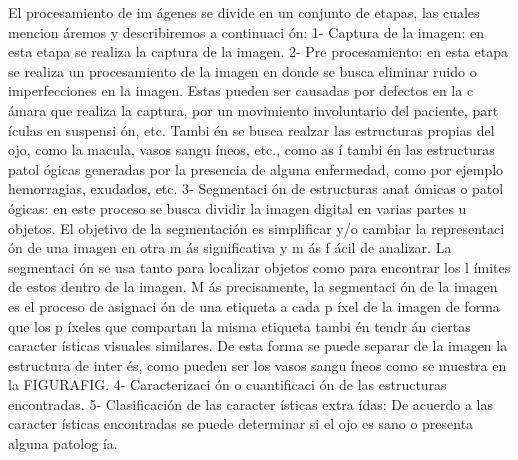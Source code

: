 El procesamiento de im \'agenes se divide en un conjunto de etapas, las cuales mencion \'aremos y describiremos a continuaci \'on:
1-	Captura de la imagen: en esta etapa se realiza la captura de la imagen.
2-	Pre procesamiento: en esta etapa se realiza un procesamiento de la imagen en donde se busca eliminar ruido o imperfecciones en la imagen. Estas pueden ser causadas por defectos en la c \'amara que realiza la captura, por un movimiento involuntario del paciente, part \'iculas en suspensi \'on, etc. Tambi \'en se busca realzar las estructuras propias del ojo, como la macula, vasos sangu \'ineos, etc.,  como as \'i tambi \'en las estructuras patol \'ogicas generadas por la presencia de alguna enfermedad, como por ejemplo hemorragias, exudados, etc. 
3-	Segmentaci \'on de estructuras anat \'omicas o patol \'ogicas: en este proceso se busca dividir la imagen digital en varias partes u objetos. El objetivo de la segmentación es simplificar y/o cambiar la representaci \'on de una imagen en otra m \'as significativa y m \'as f \'acil de analizar. La segmentaci \'on se usa tanto para localizar objetos como para encontrar los l \'imites de estos dentro de la imagen. M \'as precisamente, la segmentaci \'on de la imagen es el proceso de asignaci \'on de una etiqueta a cada p \'ixel de la imagen de forma que los p \'ixeles que compartan la misma etiqueta tambi \'en tendr \'an ciertas caracter \'isticas visuales similares. De esta forma se puede separar de la imagen la estructura de inter \'es, como pueden ser los vasos sangu \'ineos como se muestra en la FIGURAFIG.
4-	Caracterizaci \'on o cuantificaci \'on de las estructuras encontradas.
5-	Clasificación de las caracter \'isticas extra \'idas: De acuerdo a las caracter \'isticas encontradas se puede determinar si el ojo es sano o presenta alguna patolog \'ia.  


